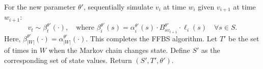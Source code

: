\begin{algorithm}[H]
\begin{algorithmic}[1]
    \State For the new parameter $\theta'$, sequentially simulate $v_i$ at time $w_i$ given $v_{i+1}$  at 
    time $w_{i+1}$:
    $$ v_t \sim \beta^{\theta'}_t(\cdot),\quad \text{where } 
    \beta^{\theta'}_i(s) = \alpha^{\theta'}_i(s)\cdot B^{\theta'}_{sv_{t+1}} \cdot \ell_i(s) \quad \forall s \in S.$$
    Here, $\beta^{\theta'}_{|W|}(\cdot) = \alpha^{\theta'}_{|W|}(\cdot)$.
    This completes the FFBS algorithm.
    \State Let $T'$ be the set of times in $W$ when the Markov chain changes state. Define $S'$ as the corresponding set of state values. Return $(S', T', \theta')$.
\end{algorithmic}
\end{algorithm}
